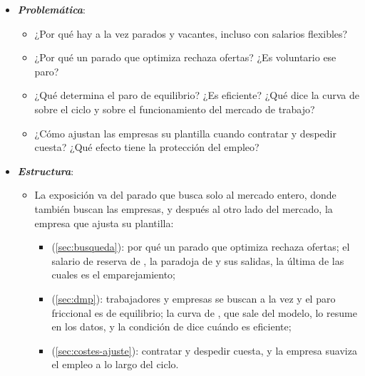 \documentclass[11pt]{article}
\begin{document}
\begin{itemize}
\item \textbf{\emph{Problemática}}:
  \begin{itemize}
  \item ¿Por qué hay a la vez parados y vacantes, incluso con salarios flexibles?
  \item ¿Por qué un parado que optimiza rechaza ofertas? ¿Es voluntario ese paro?
  \item ¿Qué determina el paro de equilibrio? ¿Es eficiente? ¿Qué dice la curva de  sobre el ciclo y sobre el funcionamiento del mercado de trabajo?
  \item ¿Cómo ajustan las empresas su plantilla cuando contratar y despedir cuesta? ¿Qué efecto tiene la protección del empleo?
  \end{itemize}

\item \textbf{\emph{Estructura}}:
  \begin{itemize}
  \item La exposición va del parado que busca solo al mercado entero, donde también buscan las empresas, y después al otro lado del mercado, la empresa que ajusta su plantilla:
  \begin{itemize}
  \item {} (\ref{sec:busqueda}): por qué un parado que optimiza rechaza ofertas; el salario de reserva de , la paradoja de  y sus salidas, la última de las cuales es el emparejamiento;
  \item {} (\ref{sec:dmp}): trabajadores y empresas se buscan a la vez y el paro friccional es de equilibrio; la curva de , que sale del modelo, lo resume en los datos, y la condición de  dice cuándo es eficiente;
  \item {} (\ref{sec:costes-ajuste}): contratar y despedir cuesta, y la empresa suaviza el empleo a lo largo del ciclo.
  \end{itemize}
  \end{itemize}
\end{itemize}
\end{document}
